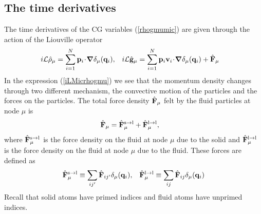 \documentclass[b5paper,openright,10pt]{book}
\newcommand{\esc}{\!\cdot\!}
\begin{document}
\subsection{The time derivatives}
The time derivatives  of the CG variables  (\ref{rhogmumic}) are given
through the action of the Liouville operator
\begin{align}
  i{\cal L}  \hat{\rho}_{\mu}&=\sum_{i=1}^N{\bf p}_i\esc\boldsymbol{\nabla}\delta_\mu({\bf q}_i),&
i{\cal L}  \hat{\bf g}_{\mu}&=\sum_{i=1}^N{\bf p}_i{\bf v}_i\esc\boldsymbol{\nabla}\delta_\mu({\bf q}_i)
+\hat{\bf F}_\mu
\label{iLMicrhogmu}
\end{align}
In the expression (\ref{iLMicrhogmu}) we see that the momentum density
changes through two different mechanism,  the convective motion of the
particles and  the forces on  the particles.  The total  force density
$\hat{\bf F}_\mu$ felt by the fluid particles at node $\mu$ is
\begin{align}
\hat{\bf F}_\mu&=    \hat{\bf F}^{\rm s\to l}_\mu+  \hat{\bf F}^{\rm l\to l}_\mu,
\end{align}
where $  \hat{\bf F}^{\rm  s\to l}_\mu$  is the  force density  on the
fluid  at node  $\mu$ due  to the  solid and  $ \hat{\bf  F}^{\rm l\to
  l}_\mu$ is the force  density on the fluid at node  $\mu$ due to the
fluid. These forces are defined as
\begin{align}
    \hat{\bf F}^{\rm s\to l}_\mu \equiv\sum_{ij'}\hat{\bf F}_{ij'}\delta_\mu({\bf q}_i), &&
 \hat{\bf F}^{\rm l\to l}_\mu \equiv\sum_{ij}\hat{\bf F}_{ij}\delta_\mu({\bf q}_i)
\label{Fbin}
\end{align}
Recall that solid atoms have  primed indices and fluid atoms have unprimed indices.
\end{document}
